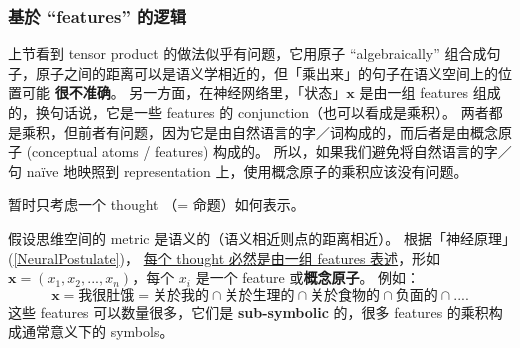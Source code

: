 \documentclass[orivec]{llncs}
\newcommand{\vect}[1]{\boldsymbol{#1}}
\begin{document}

\subsubsection{基於 ``features'' 的逻辑}

上节看到 tensor product 的做法似乎有问题，它用原子 ``algebraically'' 组合成句子，原子之间的距离可以是语义学相近的，但「乘出来」的句子在语义空间上的位置可能 \textbf{很不准确}。 另一方面，在神经网络里，「状态」$\vect{x}$ 是由一组 features 组成的，换句话说，它是一些 features 的 conjunction（也可以看成是乘积）。 两者都是乘积，但前者有问题，因为它是由自然语言的字／词构成的，而后者是由概念原子 (conceptual atoms / features) 构成的。  所以，如果我们避免将自然语言的字／句 na\"{i}ve 地映照到 representation 上，使用概念原子的乘积应该没有问题。

暂时只考虑一个 thought （= 命题）如何表示。

假设思维空间的 metric 是语义的（语义相近则点的距离相近）。 根据「神经原理」(\ref{NeuralPostulate})， \uline{每个 thought 必然是由一组 features 表述}，形如 $\vect{x} = (x_1, x_2, ..., x_n)$，每个 $x_i$ 是一个 feature 或\textbf{概念原子}。 例如：
\begin{equation}
\vect{x} = \textit{我很肚饿} = \textit{关於我的} \cap \textit{关於生理的} \cap \textit{关於食物的} \cap \textit{负面的} \cap .... 
\end{equation}
这些 features 可以数量很多，它们是 \textbf{sub-symbolic} 的，很多 features 的乘积构成通常意义下的 symbols。

\end{document}
